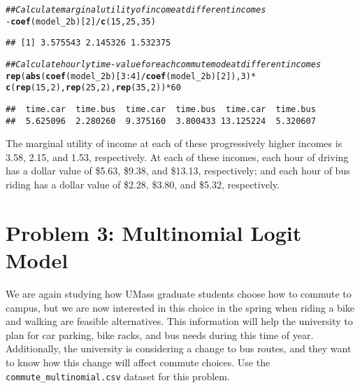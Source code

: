 \documentclass[11pt,letterpaper]{article}\usepackage[]{graphicx}\usepackage[]{color}
\makeatletter
\newcommand{\hlnum}[1]{\textcolor[rgb]{0.686,0.059,0.569}{#1}}%
\newcommand{\hlcom}[1]{\textcolor[rgb]{0.678,0.584,0.686}{\textit{#1}}}%
\newcommand{\hlopt}[1]{\textcolor[rgb]{0,0,0}{#1}}%
\newcommand{\hlstd}[1]{\textcolor[rgb]{0.345,0.345,0.345}{#1}}%
\newcommand{\hlkwd}[1]{\textcolor[rgb]{0.737,0.353,0.396}{\textbf{#1}}}%
\newenvironment{kframe}{%
 \def\at@end@of@kframe{}%
 \ifinner\ifhmode%
  \def\at@end@of@kframe{\end{minipage}}%
  \begin{minipage}{\columnwidth}%
 \fi\fi%
 \def\FrameCommand##1{\hskip\@totalleftmargin \hskip-\fboxsep
 \colorbox{shadecolor}{##1}\hskip-\fboxsep
     \hskip-\linewidth \hskip-\@totalleftmargin \hskip\columnwidth}%
 \MakeFramed {\advance\hsize-\width
   \@totalleftmargin\z@ \linewidth\hsize
   \@setminipage}}%
 {\par\unskip\endMakeFramed%
 \at@end@of@kframe}
\newenvironment{knitrout}{}{} %
\makeatother
\begin{document}
\begin{enumerate}[label=\alph*., leftmargin=*]
\begin{enumerate}[label=\roman*.]
\begin{knitrout}
\color{fgcolor}\begin{kframe}
\begin{alltt}
\hlcom{## Calculate marginal utility of income at different incomes}
\hlopt{-}\hlkwd{coef}\hlstd{(model_2b)[}\hlnum{2}\hlstd{]} \hlopt{/} \hlkwd{c}\hlstd{(}\hlnum{15}\hlstd{,} \hlnum{25}\hlstd{,} \hlnum{35}\hlstd{)}
\end{alltt}
\begin{verbatim}
## [1] 3.575543 2.145326 1.532375
\end{verbatim}
\begin{alltt}
\hlcom{## Calculate hourly time-value for each commute mode at different incomes}
\hlkwd{rep}\hlstd{(}\hlkwd{abs}\hlstd{(}\hlkwd{coef}\hlstd{(model_2b)[}\hlnum{3}\hlopt{:}\hlnum{4}\hlstd{]} \hlopt{/} \hlkwd{coef}\hlstd{(model_2b)[}\hlnum{2}\hlstd{]),} \hlnum{3}\hlstd{)} \hlopt{*}
  \hlkwd{c}\hlstd{(}\hlkwd{rep}\hlstd{(}\hlnum{15}\hlstd{,} \hlnum{2}\hlstd{),} \hlkwd{rep}\hlstd{(}\hlnum{25}\hlstd{,} \hlnum{2}\hlstd{),} \hlkwd{rep}\hlstd{(}\hlnum{35}\hlstd{,} \hlnum{2}\hlstd{))} \hlopt{*} \hlnum{60}
\end{alltt}
\begin{verbatim}
##  time.car  time.bus  time.car  time.bus  time.car  time.bus 
##  5.625096  2.280260  9.375160  3.800433 13.125224  5.320607
\end{verbatim}
\end{kframe}
\end{knitrout}

		The marginal utility of income at each of these progressively higher incomes is 3.58, 2.15, and 1.53, respectively. At each of these incomes, each hour of driving has a dollar value of \$5.63, \$9.38, and \$13.13, respectively; and each hour of bus riding has a dollar value of \$2.28, \$3.80, and \$5.32, respectively.
	\end{enumerate}
\end{enumerate}

\section*{Problem 3: Multinomial Logit Model}

We are again studying how UMass graduate students choose how to commute to campus, but we are now interested in this choice in the spring when riding a bike and walking are feasible alternatives. This information will help the university to plan for car parking, bike racks, and bus needs during this time of year. Additionally, the university is considering a change to bus routes, and they want to know how this change will affect commute choices. Use the \texttt{commute\_multinomial.csv} dataset for this problem.
\end{document}
